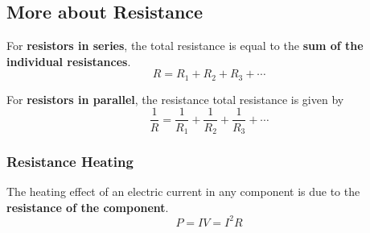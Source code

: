 \subsection{More about Resistance}

For \textbf{resistors in series}, the total resistance is equal to the \textbf{sum of the individual resistances}.
$$R=R_1+R_2+R_3+\cdots$$

For \textbf{resistors in parallel}, the resistance total resistance is given by
$$\frac{1}{R}=\frac{1}{R_1}+\frac{1}{R_2}+\frac{1}{R_3}+\cdots$$

\subsubsection*{Resistance Heating}

The heating effect of an electric current in any component is due to the \textbf{resistance of the component}.
$$P=IV=I^2R$$
